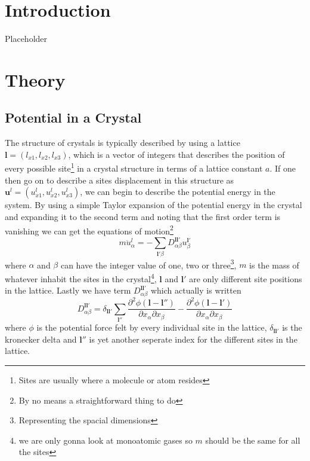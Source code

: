 \documentclass[11pt]{article}
\begin{document}
\section{Introduction}
Placeholder
\section{Theory}
\subsection{Potential in a Crystal}
The structure of crystals is typically described by using a lattice $\mathbf{l} = (l_{x1}, l_{x2}, l_{x3})$, which is a vector of integers that describes the position of every possible site\footnote{Sites are usually where a molecule or atom resides} in a crystal structure in terms of a lattice constant $a$. If one then go on to describe a sites displacement in this structure as $\mathbf{u}^l = (u^l_{x1},u^l_{x2},u^l_{x3})$, we can begin to describe the potential energy in the system. By using a simple Taylor expansion of the potential energy in the crystal and expanding it to the second term and noting that the first order term is vanishing we can get the equations of motion\footnote{By no means a straightforward thing to do} 
\begin{equation}
	m \ddot{u}^l_{\alpha} = - \sum_{\mathbf{l}'\beta} D^{\mathbf{l}\mathbf{l}'}_{\alpha \beta} u^{\mathbf{l}'}_{\beta}
	\label{eq:motion}
\end{equation}
where $\alpha$ and $\beta$ can have the integer value of one, two or three\footnote{Representing the spacial dimensions}, $m$ is the mass of whatever inhabit the sites in the crystal\footnote{we are only gonna look at monoatomic gases so $m$ should be the same for all the sites}, $\mathbf{l}$ and $\mathbf{l}'$ are only different site positions in the lattice. Lastly we have term $D^{\mathbf{l}\mathbf{l}'}_{\alpha \beta}$ which actually is written
\begin{equation}
	D^{\mathbf{l}\mathbf{l}'}_{\alpha \beta} = \delta_{\mathbf{l} \mathbf{l}'} \sum_{\mathbf{l}''} \frac{\partial^2 \phi (\mathbf{l}-\mathbf{l}'')}{\partial x_{\alpha} \partial x_{\beta}}
	-
	\frac{\partial^2 \phi (\mathbf{l}-\mathbf{l}')}{\partial x_{\alpha} \partial x_{\beta}}
\end{equation}
where $\phi$ is the potential force felt by every individual site in the lattice, $\delta_{\mathbf{l}\mathbf{l}'}$ is the kronecker delta and $\mathbf{l}''$ is yet another seperate index for the different sites in the lattice.
\end{document}
